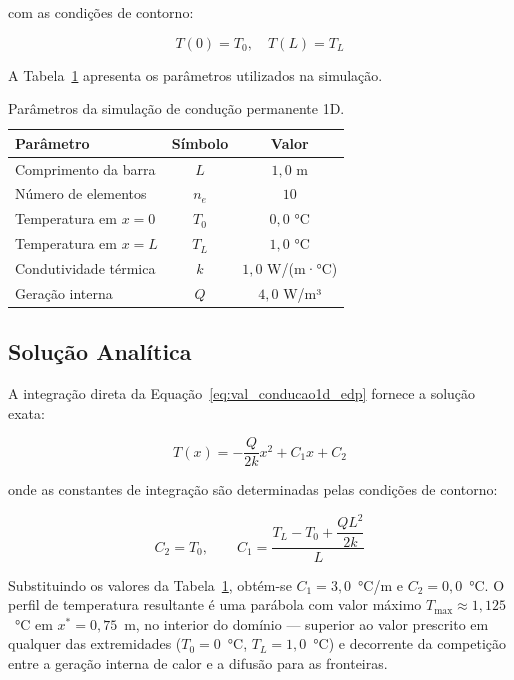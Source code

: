 \noindent com as condições de contorno:

\begin{equation}
    T(0) = T_0, \quad T(L) = T_L
    \label{eq:val_conducao1d_cc}
\end{equation}

A Tabela~\ref{tab:val_conducao1d_params} apresenta os parâmetros utilizados na simulação.

\begin{table}[htbp]
    \centering
    \caption{Parâmetros da simulação de condução permanente 1D.}
    \label{tab:val_conducao1d_params}
    \begin{tabular}{lcc}
        \hline
        \textbf{Parâmetro} & \textbf{Símbolo} & \textbf{Valor} \\
        \hline
        Comprimento da barra   & $L$    & $1{,}0$ m     \\
        Número de elementos    & $n_e$  & $10$          \\
        Temperatura em $x=0$   & $T_0$  & $0{,}0$ °C    \\
        Temperatura em $x=L$   & $T_L$  & $1{,}0$ °C    \\
        Condutividade térmica  & $k$    & $1{,}0$ W/(m·°C) \\
        Geração interna        & $Q$    & $4{,}0$ W/m³   \\
        \hline
    \end{tabular}
\end{table}

\subsection{Solução Analítica}

A integração direta da Equação~\eqref{eq:val_conducao1d_edp} fornece a solução exata:

\begin{equation}
    T(x) = -\frac{Q}{2k} x^2 + C_1 x + C_2
    \label{eq:val_conducao1d_analitica}
\end{equation}

\noindent onde as constantes de integração são determinadas pelas condições de contorno:

\begin{equation}
    C_2 = T_0, \qquad C_1 = \frac{T_L - T_0 + \dfrac{Q L^2}{2k}}{L}
    \label{eq:val_conducao1d_constantes}
\end{equation}

Substituindo os valores da Tabela~\ref{tab:val_conducao1d_params}, obtém-se $C_1 = 3{,}0$~°C/m e $C_2 = 0{,}0$~°C. O perfil de temperatura resultante é uma parábola com valor máximo $T_{\max} \approx 1{,}125$~°C em $x^{*} = 0{,}75$~m, no interior do domínio --- superior ao valor prescrito em qualquer das extremidades ($T_0 = 0$~°C, $T_L = 1{,}0$~°C) e decorrente da competição entre a geração interna de calor e a difusão para as fronteiras.

